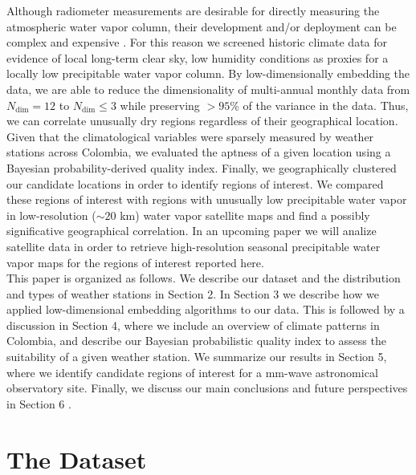 \documentclass[12pt]{iopart}
\begin{document}
Although radiometer measurements are desirable for directly measuring the atmospheric water vapor column, their development and/or deployment can be complex and expensive \cite{radiopro,receiver}. For this reason we screened historic climate data for evidence of local long-term clear sky, low humidity conditions as proxies for a locally low precipitable water vapor column. By low-dimensionally embedding the data, we are able to reduce the dimensionality of multi-annual monthly data from $N_\mathrm{dim}=12$ to $N_\mathrm{dim}\le3$ while preserving $>95$\% of the variance in the data. Thus, we can correlate unusually dry regions regardless of their geographical location. Given that the climatological variables were sparsely measured by weather stations across Colombia, we evaluated the aptness of a given location using a Bayesian probability-derived quality index. Finally, we geographically clustered our candidate locations in order to identify regions of interest. We compared these regions of interest with regions with unusually low precipitable water vapor in low-resolution ($\sim20$ km) water vapor satellite maps \cite{suen2016} and find a possibly significative geographical correlation.  In an upcoming paper we will analize satellite data in order to retrieve high-resolution seasonal precipitable water vapor maps for the regions of interest reported here.\\

This paper is organized as follows. We describe our dataset and the distribution and types of weather stations in Section 2. In Section 3 we describe how we applied low-dimensional embedding algorithms to our data. This is followed by a discussion in Section 4, where we include an overview of climate patterns in Colombia, and describe our Bayesian probabilistic quality index to assess the suitability of a given weather station. We summarize our results in Section 5, where we identify candidate regions of interest for a mm-wave astronomical observatory site. Finally, we discuss our main conclusions and future perspectives in Section 6 .
  
  
\section{The Dataset}
\end{document}
